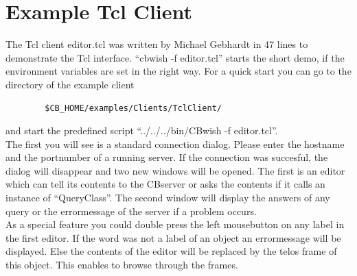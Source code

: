 \chapter{Example Tcl Client}
	The Tcl client editor.tcl was written by Michael Gebhardt in 47 lines to demonstrate
	 the Tcl interface.
	``cbwish -f editor.tcl'' starts the short demo, if the environment variables are set in the right way. 
	For a quick start you can go to the directory of the example client 
	\begin{verbatim}
		$CB_HOME/examples/Clients/TclClient/ 
	\end{verbatim}
	and start the predefined script ``../../../bin/CBwish -f editor.tcl''. \\
	The first you will see is a standard connection dialog. 
	Please enter the hostname and the portnumber of a running server.
	If the connection was succesful, the dialog will disappear 
	 and two new windows will be opened.
	The first is an editor which can tell its contents to the CBserver 
	 or asks the contents if it calls an instance of ``QueryClass''.
	The second window will display the answers of any query 
	 or the errormessage of the server if a problem occurs.\\
	As a special feature you could double press the left mousebutton on any label
	 in the first editor.
	 If the word was not a label of an object an errormessage will be displayed.
	  Else the contents of the editor will be replaced by the telos frame of this object. 
	 This enables to browse through the frames.
	 
	

